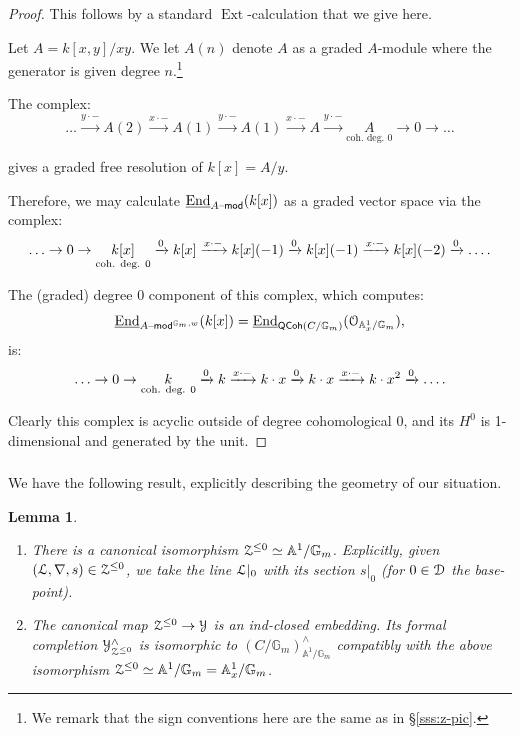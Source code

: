 \documentclass[reqno,11pt]{amsart}
\numberwithin{equation}{subsection}
\newtheorem{lem}[thm]{Lemma}
\theoremstyle{remark}
\newcommand{\xar}[1]{\xrightarrow{#1}}
\newcommand{\bA}{{\mathbb A}}
\newcommand{\bG}{{\mathbb G}}
\newcommand{\sD}{{\EuScript D}}
\newcommand{\sL}{{\EuScript L}}
\newcommand{\sO}{{\EuScript O}}
\newcommand{\sY}{{\EuScript Y}}
\newcommand{\sZ}{{\EuScript Z}}
\newcommand{\on}{\operatorname}
\newcommand{\ul}{\underline}
\newcommand{\mathendash}{\text{\textendash}}
\newcommand{\ldotsplus}{\mathinner{\ldotp\ldotp\ldotp\ldotp}}
\newcommand{\End}{\on{End}}
\newcommand{\Ext}{\on{Ext}}
\renewcommand{\mod}{\mathendash\mathsf{mod}}
\newcommand{\QCoh}{\mathsf{QCoh}}
\begin{document}
\begin{proof}

This follows by a standard $\Ext$-calculation that we give here.

Let $A = k[x,y]/xy$. We let $A(n)$ denote $A$ as a graded $A$-module
where the generator is given degree $n$.\footnote{We remark that the
sign conventions here are the same as in \S \ref{sss:z-pic}.}

The complex:
%
\[
\ldots 
\xar{y\cdot -} A(2) \xar{x\cdot -} A(1) \xar{y\cdot -} A(1) \xar{x\cdot -} A \xar{y\cdot -} \underset{\text{coh. deg. } 0} {A} \to 0 \to \ldots 
\]

\noindent gives a graded free resolution of $k[x] = A/y$.

Therefore, we may calculate $\ul{\End}_{A\mod}(k[x])$ as a
graded vector space via the complex:
%
\[
\ldots \to  0 \to \underset{\text{coh. deg. } 0}{k[x]} 
\xar{0} k[x] \xar{x \cdot-} k[x](-1)
\xar{0} k[x](-1) \xar{x \cdot-} k[x](-2) \xar{0} \ldotsplus
\]

\noindent The (graded) degree $0$ component of this complex,
which computes: $$\ul{\End}_{A\mod^{\bG_m,w}}(k[x]) = 
\ul{\End}_{\QCoh(C/\bG_m)}(\sO_{\bA_x^1/\bG_m}),$$ is:
%
\[
\ldots \to 0 \to \underset{\text{coh. deg. } 0}{k} 
\xar{0} k \xar{x \cdot-} k\cdot x
\xar{0} k\cdot x \xar{x \cdot-} k\cdot x^2 \xar{0} \ldotsplus 
\]

\noindent Clearly this complex is acyclic outside of degree cohomological $0$,
and its $H^0$ is 1-dimensional and generated by the unit. 

\end{proof}

\subsubsection{}

We have the following result, explicitly describing the geometry of our situation.

\begin{lem}\label{l:z0-emb}

\begin{enumerate}

\item There is a canonical isomorphism $\sZ^{\leq 0} \simeq \bA^1/\bG_m$.
Explicitly, given $(\sL,\nabla,s) \in \sZ^{\leq 0}$, we
take the line $\sL|_0$ with its section $s|_0$ (for $0 \in \sD$ the base-point).

\item The canonical map $\sZ^{\leq 0} \to \sY$ is an ind-closed embedding.
Its formal completion $\sY_{\sZ^{\leq 0}}^{\wedge}$ 
is isomorphic to $(C/\bG_m)_{\bA^1/\bG_m}^{\wedge}$ compatibly with
the above isomorphism $\sZ^{\leq 0} \simeq \bA^1/\bG_m = \bA_x^1/\bG_m$.

\end{enumerate}

\end{lem}
\end{document}
